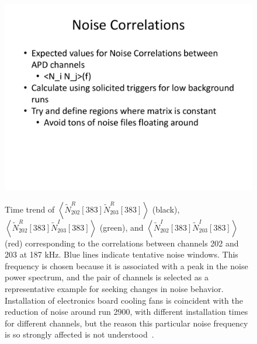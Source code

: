 \begin{figure}
\begin{center}
\includegraphics[keepaspectratio=true,page=5,width=\textwidth,clip=true,trim=0.2in 0.5in 0.5in 0.3in]{APD_Denoising_noise_correlations.pdf}
\end{center}
\renewcommand{\baselinestretch}{1}
\small\normalsize
\begin{quote}
\caption{Time trend of $\left<\widetilde{N}^R_{202}[383]\widetilde{N}^R_{203}[383]\right>$ (black), $\left<\widetilde{N}^R_{202}[383]\widetilde{N}^I_{203}[383]\right>$ (green), and $\left<\widetilde{N}^I_{202}[383]\widetilde{N}^I_{203}[383]\right>$ (red) corresponding to the correlations between channels 202 and 203 at 187 kHz.  Blue lines indicate tentative noise windows.  This frequency is chosen because it is associated with a peak in the noise power spectrum, and the pair of channels is selected as a representative example for seeking changes in noise behavior.  Installation of electronics board cooling fans is coincident with the reduction of noise around run 2900, with different installation times for different channels, but the reason this particular noise frequency is so strongly affected is not understood~\cite{MikeCoherentAPDNoise}.}
\label{fig:MikeNoise_202_203}
\end{quote}
\end{figure}
\renewcommand{\baselinestretch}{2}
\small\normalsize

